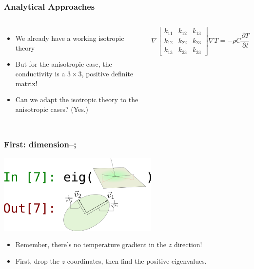 \documentclass{beamer}
\begin{document}
\begin{frame}
\frametitle{Analytical Approaches}
\begin{columns}[c]
    \begin{itemize}
    \item We already have a working isotropic theory
    \item But for the anisotropic case, the conductivity is a \(3\times 3\), positive definite matrix!
    \item Can we adapt the isotropic theory to the anisotropic cases? (Yes.)
    \end{itemize}
    \begin{equation*}
    \nabla\begin{bmatrix}
    k_{11} & k_{12} & k_{13}\\
    k_{12} & k_{22} & k_{23}\\
    k_{13} & k_{23} & k_{33}
    \end{bmatrix}\nabla T = -\rho C\frac{\partial T}{\partial t}
    \end{equation*}
\end{columns}
\end{frame}


\begin{frame}
\frametitle{First: dimension--;}
\includegraphics[width=0.6\textwidth]{fig/projection.png}
\begin{itemize}
\item Remember, there's no temperature gradient in the \(z\) direction!
\item First, drop the \(z\) coordinates, then find the positive eigenvalues.
\end{itemize}
\end{frame}
\end{document}
